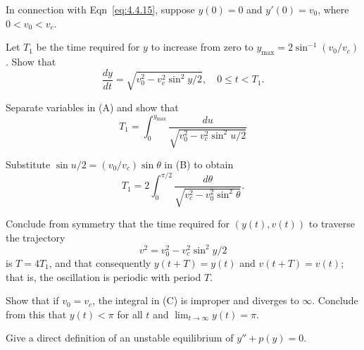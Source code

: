 \begin{exerciselist}
\item\label{exer:4.4.21}In connection with Eqn~\eqref{eq:4.4.15},
suppose   $y(0)=0$ and $y'(0)=v_0$, where $0<v_0<v_c$.
\begin{alist}
\item %
Let  $T_1$ be the time
required for  $y$ to increase from zero to
$y_{\max}=2\sin^{-1}(v_0/v_c)$. Show that
\[
\frac{dy}{dt}=\sqrt{v_0^2-v_c^2\sin^2y/2},\quad 0\le t<T_1.\tag{A}
\]
\item %
Separate variables in (A) and show that
\[
T_1=\int_0^{y_{\max}}\frac{du}{\sqrt{v_0^2-v_c^2\sin^2u/2}}\tag{B}
\]
\item %
Substitute $\sin u/2=(v_0/v_c)\sin\theta$ in (B) to obtain
\[
T_1=2\int_0^{\pi/2}\frac{d\theta}{\sqrt{v_c^2-v_0^2\sin^2\theta}}.\tag{C}
\]
\item %
Conclude from  symmetry
that  the time required for  $(y(t),v(t))$ to traverse the
trajectory
\[
v^2=v_0^2-v_c^2\sin^2y/2
\]
is $T=4T_1$, and that consequently $y(t+T)=y(t)$ and $v(t+T)=v(t)$;
that is, the oscillation is periodic with period $T$.
\item %
Show that if $v_0=v_c$,  the integral in (C) is improper and
diverges to $\infty$. Conclude from this  that $y(t)<\pi$
for all $t$ and $\lim_{t\to\infty}y(t)=\pi$.
\end{alist}


\item\label{exer:4.4.22}Give a direct definition of an unstable equilibrium of $y''+p(y)=0$.


\end{exerciselist}
